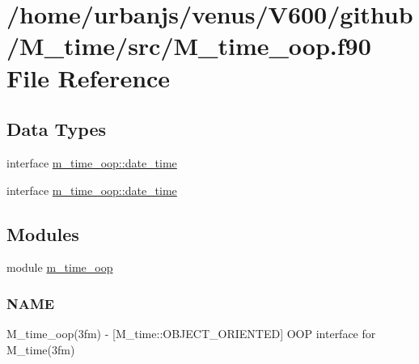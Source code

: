 \hypertarget{M__time__oop_8f90}{}\section{/home/urbanjs/venus/\+V600/github/\+M\+\_\+time/src/\+M\+\_\+time\+\_\+oop.f90 File Reference}
\label{M__time__oop_8f90}
\subsection*{Data Types}
\begin{DoxyCompactItemize}
\item 
interface \mbox{\hyperlink{structm__time__oop_1_1date__time}{m\+\_\+time\+\_\+oop\+::date\+\_\+time}}
\item 
interface \mbox{\hyperlink{structm__time__oop_1_1date__time}{m\+\_\+time\+\_\+oop\+::date\+\_\+time}}
\end{DoxyCompactItemize}
\subsection*{Modules}
\begin{DoxyCompactItemize}
\item 
module \mbox{\hyperlink{namespacem__time__oop}{m\+\_\+time\+\_\+oop}}
\begin{DoxyCompactList}\small\item\em \subsubsection*{N\+A\+ME}

M\+\_\+time\+\_\+oop(3fm) -\/ \mbox{[}M\+\_\+time\+::\+O\+B\+J\+E\+C\+T\+\_\+\+O\+R\+I\+E\+N\+T\+ED\mbox{]} O\+OP interface for M\+\_\+time(3fm) \end{DoxyCompactList}\end{DoxyCompactItemize}

